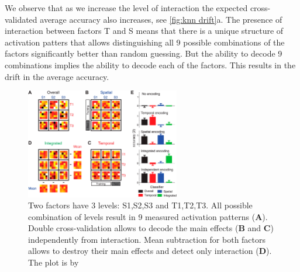 We observe that as we increase the level of interaction the expected cross-validated average accuracy also increases, see \autoref{fig:knn drift}a. The presence of interaction between factors T and S means that there is a unique structure of activation patters that allows distinguishing all 9 possible combinations of the factors significantly better than random guessing. But the ability to decode 9 combinations implies the ability to decode each of the factors. This results in the drift in the average accuracy.

\begin{figure}[t]
\centering
\includegraphics[width=0.60\textwidth,clip=true,trim=0 0 28cm 0]{elife-03043-fig3-v1}
\caption{Two factors have 3 levels: S1,S2,S3 and T1,T2,T3. All possible combination of levels result in 9 measured activation patterns ({\bf A}). Double cross-validation allows to decode the main effects ({\bf B} and {\bf C}) independently from interaction. Mean subtraction for both factors allows to destroy their main effects and detect only interaction ({\bf D}). The plot is by~\cite{Kornysheva2014}}\label{fig:patterns}
\end{figure}

